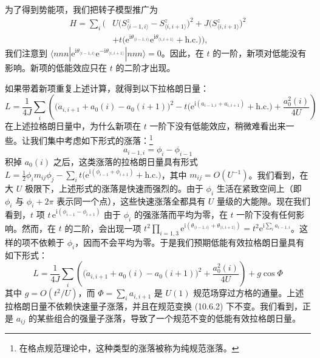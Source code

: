 为了得到势能项，我们把转子模型推广为
\begin{equation*}
\begin{split}
H=\sum_{i}\Big(&U\big(S_{\langle i-1,i\rangle}^{z}-S_{\langle i,i+1\rangle}^{z}\big)^{2}+J\big(S_{\langle i,i+1\rangle}^{z}\big)^{2}\\
&+t\big(\mathrm{e}^{\mathrm{i}\theta_{\langle i-1,i\rangle}}\mathrm{e}^{\mathrm{i}\theta_{\langle i,i+1\rangle}}+\text{h.c.}\big)\Big),
\end{split} \tag{10.6.3}
\end{equation*}
我们注意到 $\langle nnn|\mathrm{e}^{\mathrm{i}\theta_{\langle i-1,i\rangle}}\mathrm{e}^{-\mathrm{i}\theta_{\langle i,i+1\rangle}}|nnn\rangle=0$。因此，在 $t$ 的一阶，新项对低能没有影响。新项的低能效应只在 $t$ 的二阶才出现。

如果带着新项重复上述计算，就得到以下拉格朗日量：
\begin{equation*}
L=\frac{1}{4J}\sum_{i}\left(\big(\dot a_{i,i+1}+a_0(i)-a_0(i+1)\big)^{2}-t\big(\mathrm{e}^{\mathrm{i}(a_{i-1,i}+a_{i,i+1})}+\text{h.c.}\big)+\frac{a_0^{2}(i)}{4U}\right)
\end{equation*}
在上述拉格朗日量中，为什么新项在 $t$ 一阶下没有低能效应，稍微难看出来一些。让我们集中考虑如下形式的涨落：\footnote{在格点规范理论中，这种类型的涨落被称为纯规范涨落。}
\begin{equation*}
a_{i-1,i}=\phi_{i}-\phi_{i-1}
\end{equation*}
积掉 $a_0(i)$ 之后，这类涨落的拉格朗日量具有形式 $L=\frac{1}{2}\phi_{i}m_{ij}\phi_{j}-\sum_{i}t\big(\mathrm{e}^{\mathrm{i}(\phi_{i-1}+\phi_{i+1})}+\text{h.c.}\big)$，其中 $m_{ij}=O(U^{-1})$。我们看到，在大 $U$ 极限下，上述形式的涨落是快速而强烈的。由于 $\phi_{i}$ 生活在紧致空间上（即 $\phi_{i}$ 与 $\phi_{i}+2\pi$ 表示同一个点），这些快速涨落全都具有 $U$ 量级的大能隙。现在我们看到，$t$ 项 $t\,\mathrm{e}^{\mathrm{i}(\phi_{i-1}-\phi_{i+1})}$ 由于 $\phi_{i}$ 的强涨落而平均为零，在 $t$ 一阶下没有任何影响。然而，在 $t$ 的二阶，会出现一项 $t^{2}\prod_{i=1,3}\mathrm{e}^{\mathrm{i}(\theta_{\langle i-1,i\rangle}+\theta_{\langle i,i+1\rangle})}=t^{2}\mathrm{e}^{\mathrm{i}\sum_{i}a_{i-1,i}}$。这样的项不依赖于 $\phi_{i}$，因而不会平均为零。于是我们预期低能有效拉格朗日量具有如下形式：
\begin{equation*}
L=\frac{1}{4J}\sum_{i}\left(\big(\dot a_{i,i+1}+a_0(i)-a_0(i+1)\big)^{2}+\frac{a_0^{2}(i)}{4U}\right)+g\cos\Phi \tag{10.6.4}
\end{equation*}
其中 $g=O(t^{2}/U)$，而 $\Phi=\sum_{i}a_{i,i+1}$ 是 $U(1)$ 规范场穿过方格的通量。上述拉格朗日量不依赖快速量子涨落，并且在规范变换 (10.6.2) 下不变。我们看到，正是 $a_{ij}$ 的某些组合的强量子涨落，导致了一个规范不变的低能有效拉格朗日量。

